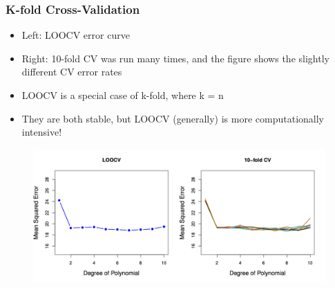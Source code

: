 \documentclass[
  shownotes,
  xcolor={svgnames},
  hyperref={colorlinks,citecolor=DarkBlue,linkcolor=DarkRed,urlcolor=DarkBlue}
  ]{beamer}
\begin{document}
\begin{frame}[fragile]
\frametitle{K-fold Cross-Validation}
\begin{itemize}
  \scriptsize
\item Left: LOOCV  error curve
\item Right: 10-fold CV was run many times, and the figure shows the slightly different CV error rates
\item LOOCV is a special case of k-fold, where k = n
\item They are both stable, but LOOCV (generally) is more computationally intensive! 
\end{itemize}

        \begin{figure}[H] \centering
            \captionsetup{justification=centering}
              \includegraphics[scale=0.5]{figures/fig54.png}
       \end{figure}
\end{frame}
\end{document}
